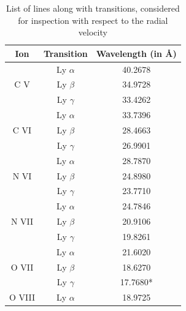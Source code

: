                 \begin{table}[h!]
                    \centering
                    \caption{List of lines along with transitions, considered for inspection with respect to the radial velocity}
                    \label{tab:line-list}
                    \begin{tabular}{ccc}
                        \hline
                        \textbf{Ion} & \textbf{Transition} & \textbf{Wavelength (in \AA)} \\ \hline
                        \multirow{3}{*}{C V}      & {Ly $\alpha$} & {40.2678} \\ %
                                                  & {Ly $\beta$}  & {34.9728} \\ %
                                                  & {Ly $\gamma$} & {33.4262} \\ \hline
                        \multirow{3}{*}{C VI}     & {Ly $\alpha$} & {33.7396} \\ %
                                                  & {Ly $\beta$}  & {28.4663} \\ %
                                                  & {Ly $\gamma$} & {26.9901} \\ \hline
                        \multirow{3}{*}{N VI}     & {Ly $\alpha$} & {28.7870} \\ %
                                                  & {Ly $\beta$}  & {24.8980} \\ %
                                                  & {Ly $\gamma$} & {23.7710} \\ \hline
                        \multirow{3}{*}{N VII}    & {Ly $\alpha$} & {24.7846} \\ %
                                                  & {Ly $\beta$}  & {20.9106} \\ %
                                                  & {Ly $\gamma$} & {19.8261} \\ \hline
                        \multirow{3}{*}{O VII}    & {Ly $\alpha$} & {21.6020} \\ %
                                                  & {Ly $\beta$}  & {18.6270} \\ %
                                                  & {Ly $\gamma$} & {17.7680*} \\ \hline
                        \multirow{3}{*}{O VIII}   & {Ly $\alpha$} & {18.9725} \\ %

\end{tabular}
\end{table}
